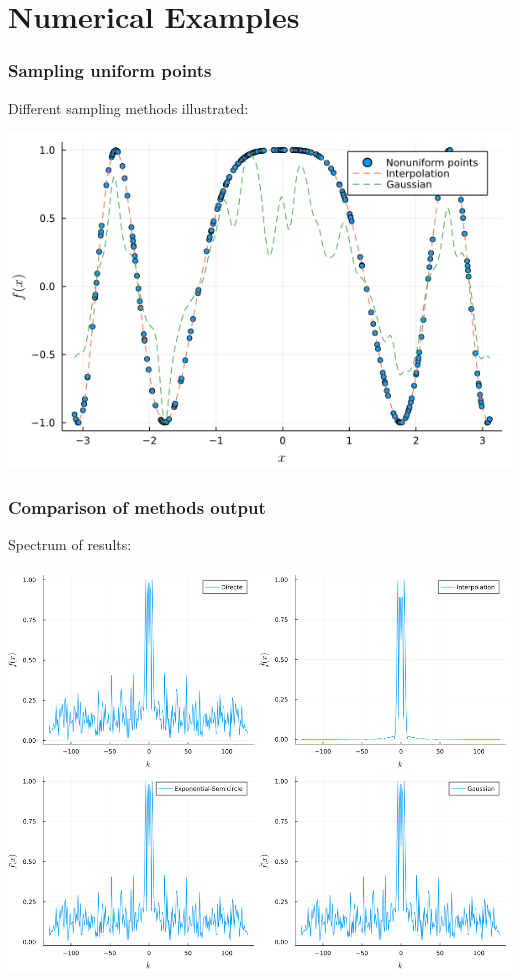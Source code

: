 \documentclass{beamer}
\begin{document}
\section{Numerical Examples}

\begin{frame}
    \sectionpage
\end{frame}

\begin{frame}
  \frametitle{Sampling uniform points}
  Different sampling methods illustrated:

  \vfill

  \centering \includegraphics[width=.8\textwidth]{images/conv_vs_interp.png}
\end{frame}

\begin{frame}
  \frametitle{Comparison of methods output}
  Spectrum of results:

  \vfill

  \centering \includegraphics[width=.8\textwidth]{images/spectrum.png}

\end{frame}
\end{document}

